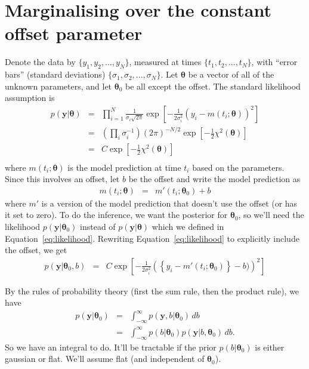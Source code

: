 \documentclass[a4paper, 11pt]{article}
\title{}
\author{}
\newcommand{\yy}{\boldsymbol{y}}	%
\newcommand{\btheta}{\boldsymbol{\theta}}  %
\begin{document}

\section{Marginalising over the constant offset parameter}
Denote the data by $\{y_1, y_2, ..., y_N\}$, measured at times
$\{t_1, t_2, ..., t_N\}$, with ``error bars'' (standard deviations)
$\{\sigma_1, \sigma_2, ..., \sigma_N\}$. Let
$\btheta$ be a vector of all of the unknown parameters,
and let $\btheta_0$ be all except the offset.
The standard likelihood assumption is
\begin{eqnarray}
p(\yy | \btheta) &=& \prod_{i=1}^N \frac{1}{\sigma_i\sqrt{2\pi}}
\exp\left[
-\frac{1}{2\sigma_i^2}
\left(y_i - m(t_i ;\btheta)
\right)^2
\right]\\
&=&
\left(\prod_i \sigma_i^{-1}\right)(2\pi)^{-N/2}
\exp\left[-\frac{1}{2}\chi^2(\btheta)\right]\\
&=&
C
\exp\left[-\frac{1}{2}\chi^2(\btheta)\right]\\
\label{eq:likelihood}
\end{eqnarray}
where $m(t_i; \btheta)$ is the model prediction at time $t_i$ based on the
parameters. Since this involves an offset, let $b$ be the offset and write
the model prediction as
\begin{eqnarray}
m(t_i; \btheta) &=& m'(t_i; \btheta_0) + b
\end{eqnarray}
where $m'$ is a version of the model prediction that doesn't use the offset
(or has it set to zero). To do the inference, we want the posterior for
$\btheta_0$, so we'll need the likelihood $p(\yy | \btheta_0)$ instead of
$p(\yy | \btheta)$ which we defined in Equation~\ref{eq:likelihood}.
Rewriting Equation~\ref{eq:likelihood} to explicitly include the offset, we
get
\begin{eqnarray}
p(\yy | \btheta_0, b) &=& C
\exp\left[
-\frac{1}{2\sigma_i^2}
\left(\left\{y_i - m'(t_i; \btheta_0)\right\} - b)
\right)^2
\right]
\end{eqnarray}

By the rules of probability theory (first the sum rule, then the product rule),
we have
\begin{eqnarray}
p(\yy | \btheta_0) &=& \int_{-\infty}^\infty p(\yy, b | \btheta_0) \, db\\
&=& \int_{-\infty}^\infty p(b | \btheta_0)p(\yy | b, \btheta_0) \, db.
\end{eqnarray}
So we have an integral to do. It'll be tractable if the prior $p(b | \btheta_0)$
is either gaussian or flat. We'll assume flat (and independent of $\btheta_0$).
\end{document}
